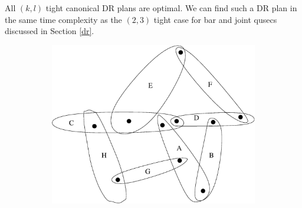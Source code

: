 \begin{remark}
    All $(k,l)$ tight canonical DR plans are optimal. We can find such a DR plan in the same time complexity as the $(2,3)$ tight case for bar and joint qusecs discussed in Section \ref{dr}.
\end{remark}
\begin{figure}\centering
\begin{subfigure}{0.2\linewidth}\centering
    \includegraphics[width=\linewidth]{img/bodypin}
    \caption{}
\end{subfigure}
\begin{subfigure}{0.2\linewidth}\centering
\end{subfigure}
\end{figure}
